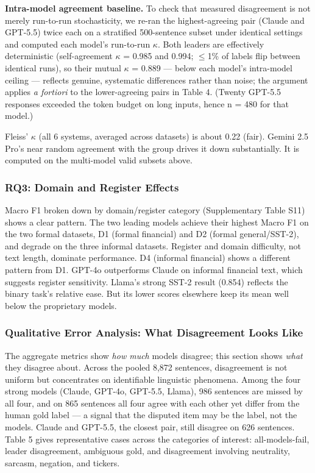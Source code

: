 \documentclass[11pt]{article}
\begin{document}
\textbf{Intra-model agreement baseline.} To check that measured
disagreement is not merely run-to-run stochasticity, we re-ran the
highest-agreeing pair (Claude and GPT-5.5) twice each on a stratified
500-sentence subset under identical settings and computed each model's
run-to-run $\kappa$. Both leaders are effectively deterministic (self-agreement
$\kappa$ = 0.985 and 0.994; $\leq$1\% of labels flip between identical runs), so
their mutual $\kappa$ = 0.889 --- below each model's intra-model ceiling ---
reflects genuine, systematic differences rather than noise; the argument
applies \emph{a fortiori} to the lower-agreeing pairs in Table 4.
(Twenty GPT-5.5 responses exceeded the token budget on long inputs,
hence n = 480 for that model.)

Fleiss' $\kappa$ (all 6 systems, averaged across datasets) is about 0.22
(fair). Gemini 2.5 Pro's near random agreement with the group drives it
down substantially. It is computed on the multi-model valid subsets
above.

\subsubsection{RQ3: Domain and Register
Effects}\label{rq3-domain-and-register-effects}

Macro F1 broken down by domain/register category (Supplementary Table
S11) shows a clear pattern. The two leading models achieve their highest
Macro F1 on the two formal datasets, D1 (formal financial) and D2
(formal general/SST-2), and degrade on the three informal datasets.
Register and domain difficulty, not text length, dominate performance.
D4 (informal financial) shows a different pattern from D1. GPT-4o
outperforms Claude on informal financial text, which suggests register
sensitivity. Llama's strong SST-2 result (0.854) reflects the binary
task's relative ease. But its lower scores elsewhere keep its mean well
below the proprietary models.

\subsubsection{Qualitative Error Analysis: What Disagreement Looks
Like}\label{qualitative-error-analysis-what-disagreement-looks-like}

The aggregate metrics show \emph{how much} models disagree; this section
shows \emph{what} they disagree about. Across the pooled 8,872
sentences, disagreement is not uniform but concentrates on identifiable
linguistic phenomena. Among the four strong models (Claude, GPT-4o,
GPT-5.5, Llama), 986 sentences are missed by all four, and on 865
sentences all four agree with each other yet differ from the human gold
label --- a signal that the disputed item may be the label, not the
models. Claude and GPT-5.5, the closest pair, still disagree on 626
sentences. Table 5 gives representative cases across the categories of
interest: all-models-fail, leader disagreement, ambiguous gold, and
disagreement involving neutrality, sarcasm, negation, and tickers.
\end{document}
